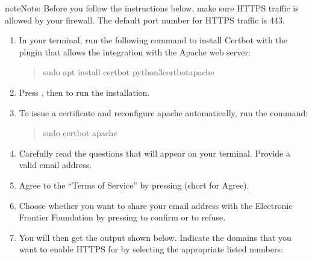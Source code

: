 \documentclass[letterpaper,10pt,english]{sphinxmanual}
\begin{document}
\begin{sphinxadmonition}{note}{Note:}
\sphinxAtStartPar
Before you follow the instructions below, make sure HTTPS traffic is allowed by your firewall. The default port number for HTTPS traffic is 443.
\end{sphinxadmonition}
\begin{enumerate}
%
\item {} 
\sphinxAtStartPar
In your terminal, run the following command to install Certbot with the plugin that allows the integration with the Apache web server:
\begin{quote}

\begin{sphinxVerbatim}[commandchars=\\\{\}]
\PYGZdl{} sudo apt install certbot python3\PYGZhy{}certbot\PYGZhy{}apache
\end{sphinxVerbatim}
\end{quote}

\item {} 
\sphinxAtStartPar
Press , then  to run the installation.

\item {} 
\sphinxAtStartPar
To issue a certificate and reconfigure apache automatically, run the command:
\begin{quote}

\begin{sphinxVerbatim}[commandchars=\\\{\}]
\PYGZdl{} sudo certbot \PYGZhy{}\PYGZhy{}apache
\end{sphinxVerbatim}
\end{quote}

\item {} 
\sphinxAtStartPar
Carefully read the questions that will appear on your terminal. Provide a valid email address.

\item {} 
\sphinxAtStartPar
Agree to the “Terms of Service” by pressing  (short for Agree).

\item {} 
\sphinxAtStartPar
Choose whether you want to share your email address with the Electronic Frontier Foundation by pressing  to confirm or  to refuse.

\newpage

\item {} 
\sphinxAtStartPar
You will then get the output shown below. Indicate the domains that you want to enable HTTPS for by selecting the appropriate listed numbers:
\begin{quote}


\end{quote}
\end{enumerate}
\end{document}

